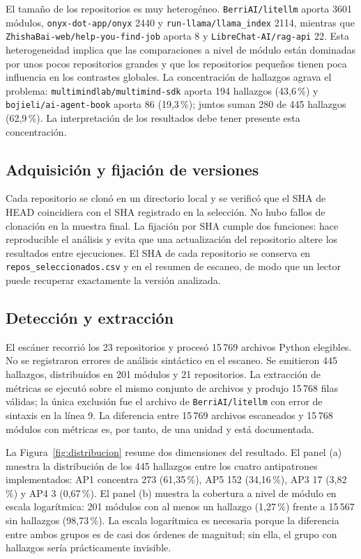 

El tamaño de los repositorios es muy heterogéneo. \texttt{BerriAI/litellm} aporta 3601 módulos, \texttt{onyx-dot-app/onyx} 2440 y \texttt{run-llama/llama\_index} 2114, mientras que \texttt{ZhishaBai-web/help-you-find-job} aporta 8 y \texttt{LibreChat-AI/rag-api} 22. Esta heterogeneidad implica que las comparaciones a nivel de módulo están dominadas por unos pocos repositorios grandes y que los repositorios pequeños tienen poca influencia en los contrastes globales. La concentración de hallazgos agrava el problema: \texttt{multimindlab/multimind-sdk} aporta 194 hallazgos (43,6\,\%) y \texttt{bojieli/ai-agent-book} aporta 86 (19,3\,\%); juntos suman 280 de 445 hallazgos (62,9\,\%). La interpretación de los resultados debe tener presente esta concentración.

\subsection{Adquisición y fijación de versiones}

Cada repositorio se clonó en un directorio local y se verificó que el SHA de HEAD coincidiera con el SHA registrado en la selección. No hubo fallos de clonación en la muestra final. La fijación por SHA cumple dos funciones: hace reproducible el análisis y evita que una actualización del repositorio altere los resultados entre ejecuciones. El SHA de cada repositorio se conserva en \texttt{repos\_seleccionados.csv} y en el resumen de escaneo, de modo que un lector puede recuperar exactamente la versión analizada.

\subsection{Detección y extracción}

El escáner recorrió los 23 repositorios y procesó 15\,769 archivos Python elegibles. No se registraron errores de análisis sintáctico en el escaneo. Se emitieron 445 hallazgos, distribuidos en 201 módulos y 21 repositorios. La extracción de métricas se ejecutó sobre el mismo conjunto de archivos y produjo 15\,768 filas válidas; la única exclusión fue el archivo de \texttt{BerriAI/litellm} con error de sintaxis en la línea 9. La diferencia entre 15\,769 archivos escaneados y 15\,768 módulos con métricas es, por tanto, de una unidad y está documentada.

La Figura~\ref{fig:distribucion} resume dos dimensiones del resultado. El panel (a) muestra la distribución de los 445 hallazgos entre los cuatro antipatrones implementados: AP1 concentra 273 (61,35\,\%), AP5 152 (34,16\,\%), AP3 17 (3,82\,\%) y AP4 3 (0,67\,\%). El panel (b) muestra la cobertura a nivel de módulo en escala logarítmica: 201 módulos con al menos un hallazgo (1,27\,\%) frente a 15\,567 sin hallazgos (98,73\,\%). La escala logarítmica es necesaria porque la diferencia entre ambos grupos es de casi dos órdenes de magnitud; sin ella, el grupo con hallazgos sería prácticamente invisible.

